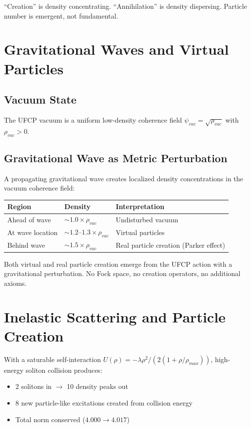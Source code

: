 \documentclass[11pt, a4paper]{article}
\begin{document}
``Creation'' is density concentrating. ``Annihilation'' is density
dispersing. Particle number is emergent, not fundamental.

\section{Gravitational Waves and Virtual Particles}

\subsection{Vacuum State}

The UFCP vacuum is a uniform low-density coherence field
$\psi_{vac} = \sqrt{\rho_{vac}}$ with $\rho_{vac} > 0$.

\subsection{Gravitational Wave as Metric Perturbation}

A propagating gravitational wave creates localized density
concentrations in the vacuum coherence field:

\begin{center}
\begin{tabular}{@{}lll@{}}
\toprule
\textbf{Region} & \textbf{Density} & \textbf{Interpretation} \\
\midrule
Ahead of wave & $\sim 1.0\times\rho_{vac}$ & Undisturbed vacuum \\
At wave location & $\sim 1.2$--$1.3\times\rho_{vac}$ &
  Virtual particles \\
Behind wave & $\sim 1.5\times\rho_{vac}$ &
  Real particle creation (Parker effect) \\
\bottomrule
\end{tabular}
\end{center}

Both virtual and real particle creation emerge from the UFCP action
with a gravitational perturbation. No Fock space, no creation
operators, no additional axioms.

\section{Inelastic Scattering and Particle Creation}

With a saturable self-interaction
$U(\rho) = -\lambda\rho^2 / (2(1 + \rho/\rho_{max}))$, high-energy
soliton collision produces:
\begin{itemize}[nosep]
  \item 2 solitons in $\to$ 10 density peaks out
  \item 8 new particle-like excitations created from collision energy
  \item Total norm conserved ($4.000 \to 4.017$)
\end{itemize}
\end{document}
